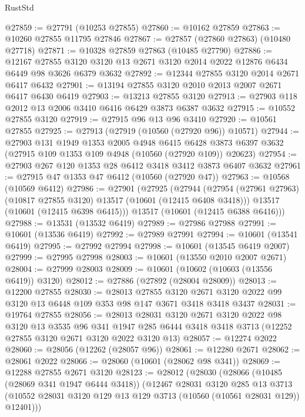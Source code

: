 \begin{lexlean}{RustStd}
\begin{coremodule}
@27859 := @27791 (@10253 @27855)
@27860 := @10162 @27859
@27863 := @10260 @27855 @11795 @27846
@27867 := @27857 (@27860 @27863) (@10480 @27718)
@27871 := @10328 @27859 @27863 (@10485 @27790)
@27886 := @12167
    @27855
    @3120
    @3120
    @13
    @2671
    @3120
    @2014
    @2022
    @12876
    @6434
    @6449
    @98
    @3626
    @6379
    @3632
@27892 := @12344 @27855 @3120 @2014 @2671 @6417 @6432
@27901 := @13194 @27855 @3120 @2010 @2013 @2007 @2671 @6417 @6430 @6419
@27903 := @13213 @27855 @3120
@27913 := @27903 @118 @2012 @13 @2006 @3410 @6416 @6429 @3873 @6387 @3632
@27915 := @10552 @27855 @3120
@27919 := @27915 @96 @13 @96 @3410
@27920 := @10561 @27855
@27925 := @27913 (@27919 (@10560 (@27920 @96)) @10571)
@27944 := @27903
    @131
    @1949
    @1353
    @2005
    @4948
    @6415
    @6428
    @3873
    @6397
    @3632
    (@27915 @109 @1353 @109 @4948 (@10560 (@27920 @109)) @20623)
@27954 := @27903 @267 @120 @1353 @28 @6412 @3418 @3412 @3873 @6407 @3632
@27961 := @27915 @47 @1353 @47 @6412 (@10560 (@27920 @47))
@27963 := @10568 (@10569 @6412)
@27986 := @27901
    (@27925
      (@27944
        (@27954 (@27961 @27963) (@10817 @27855 @3120) @13517 (@10601 (@12415 @6408 @3418)))
        @13517
        (@10601 (@12415 @6398 @6415)))
      @13517
      (@10601 (@12415 @6388 @6416)))
@27988 := @13531 (@13532 @6419)
@27989 := @27986 @27988
@27991 := @10601 (@13536 @6419)
@27992 := @27989 @27991
@27994 := @10601 (@13541 @6419)
@27995 := @27992 @27994
@27998 := @10601 (@13545 @6419 @2007)
@27999 := @27995 @27998
@28003 := @10601 (@13550 @2010 @2007 @2671)
@28004 := @27999 @28003
@28009 := @10601 (@10602 (@10603 (@13556 @6419)) @3120)
@28012 := @27886 (@27892 (@28004 @28009))
@28013 := @12200 @27855
@28030 := @28013
    @27855
    @3120
    @2671
    @3120
    @2022
    @99
    @3120
    @13
    @6448
    @109
    @353
    @98
    @147
    @3671
    @3418
    @3418
    @3437
@28031 := @19764 @27855
@28056 := @28013
    @28031
    @3120
    @2671
    @3120
    @2022
    @98
    @3120
    @13
    @3535
    @96
    @341
    @1947
    @285
    @6444
    @3418
    @3418
    @3713
    (@12252 @27855 @3120 @2671 @3120 @2022 @3120 @13)
@28057 := @12274 @2022
@28060 := @28056 (@12262 (@28057 @96))
@28061 := @12280 @2671
@28062 := @28061 @2022
@28066 := @28060 (@10601 (@28062 @98 @341))
@28069 := @12288 @27855 @2671 @3120
@28123 := @28012
    (@28030
      (@28066
        (@10485 (@28069 @341 @1947 @6444 @3418))
        (@12467
          @28031
          @3120
          @285
          @13
          @3713
          (@10552 @28031 @3120 @129 @13 @129 @3713 (@10560 (@10561 @28031 @129)) @12401)))

\end{coremodule}
\end{lexlean}
